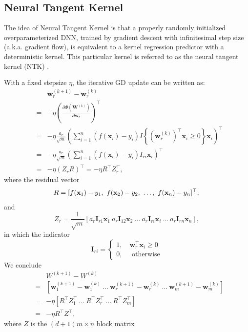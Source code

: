 \documentclass[letterpaper,12pt]{article}
\begin{document}
\subsection{Neural Tangent Kernel}
The idea of Neural Tangent Kernel is that a properly randomly initialized overparameterized DNN, trained by gradient descent with infinitesimal step size (a.k.a. gradient flow), is equivalent to a kernel regression predictor with a deterministic kernel. This particular kernel is referred to as the neural tangent kernel (NTK) \cite{du_2020}.

With a fixed stepsize $\eta$, the iterative GD update can be written as:
\begin{eqnarray}
&& \mathbf{w}_{r}^{(k+1)}-\mathbf{w}_{r}^{(k)} \\&=&-\eta \left(\frac{\partial \Phi(\mathbf{W}^{(k)})}{\partial \mathbf{w}_{r}}\right)^{\top}\\
&=&-\eta \frac{a_{r}}{\sqrt{m}} \left(\sum_{i=1}^{n}\left(f\left(\mathbf{x}_{i}\right)-y_{i}\right) I\left\{ \left(\mathbf{w}^{(k)}_{r} \right)^{\top} \mathbf{x}_{i} \geq 0\right\} \mathbf{x}_{i}\right)^{\top}\\
&=& -\eta \frac{a_r}{\sqrt{m}} \left( \sum_{i=1}^{n} \left( f(\mathbf{x}_i) -y_{i} \right)I_{ri} \mathbf{x}_i\right)^{\top}\\
&= & -\eta (Z_r R)^{\top}= -\eta R^{\top}Z_r^{\top}, 
\end{eqnarray}
where the residual vector
\begin{equation}
    R = [f(\mathbf{x}_1) -y_{1},\ f(\mathbf{x}_2) -y_{2},\ \ldots,\  f(\mathbf{x}_n) -y_{n}]^{\top},\\
\end{equation}
and
\begin{equation}\label{eq:Zr}
    Z_r = \frac{1}{\sqrt{m}} [ a_{r} \mathbf{I}_{r1} \mathbf{x}_{1} \ a_{r} \mathbf{I}_{12} \mathbf{x}_{2}\ \ldots \ a_{r}\mathbf{I}_{r i}\mathbf{x}_{i}\ \ldots\  a_{r} \mathbf{I}_{r n} \mathbf{x}_{n} ],
\end{equation}
in which the indicator 
\begin{equation}
\mathbf{I}_{r i} =\left\{\begin{array}{l}
1  , \quad\mathbf{w}_{r}^{\top} \mathbf{x}_{i} \geq 0 \\
0  , \quad \text { otherwise}
\end{array}\right.
\end{equation}
We conclude
\begin{eqnarray}
    && W^{(k+1)} - W^{(k)}\\
    &=& [\mathbf{w}_{1}^{(k+1)}-\mathbf{w}_{1}^{(k)}\ \ldots\  \mathbf{w}_{r}^{(k+1)}-\mathbf{w}_{r}^{(k)}\ \ldots\   \mathbf{w}_{m}^{(k+1)}-\mathbf{w}_{m}^{(k)} ]\\
   &=& -\eta [  R^{\top}Z_1^{\top}\ \ldots\  R^{\top}Z_r^{\top}\ \ldots\  R^{\top}Z_m^{\top}]\\
   &=& - \eta R^{\top} Z^{\top},\label{eq:eta}
\end{eqnarray}
where $Z$ is the $(d+1) m \times n$ block matrix
\end{document}
